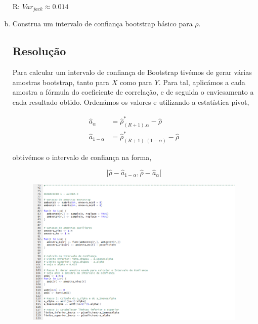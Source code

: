 \documentclass{article}
\begin{document}
\begin{enumerate}[(a)]
						R: $Var_{jack} \approx 0.014$
				
				\item Construa um intervalo de confiança bootstrap básico para $\rho$.
				
				\subsection*{Resolução}				
				
					Para calcular um intervalo de confiança de Bootstrap tivémos de gerar várias amostras bootstrap, tanto para $X$ como para $Y$. Para tal, aplicámos a cada amostra a fórmula do coeficiente de correlação, e de seguida o enviesamento a cada resultado obtido. Ordenámos os valores e utilizando a estatística pivot,

					\begin{align*}
						\hat{a}_\alpha &= \hat{\rho}_{(R+1).\alpha}^* - \hat{\rho}\\
						\hat{a}_{1 - \alpha} &= \hat{\rho}_{(R+1).(1 - \alpha)}^* - \hat{\rho}
					\end{align*}	

					obtivémos o intervalo de confiança na forma,

					\begin{equation*}
							]\hat{\rho} - \hat{a}_{1 - \alpha}, \hat{\rho} - \hat{a}_\alpha [
					\end{equation*}	

\newpage

					\begin{figure}[!h]
						\includegraphics[scale=0.4]{ex1c)}
					\end{figure}


\end{enumerate}
\end{document}
